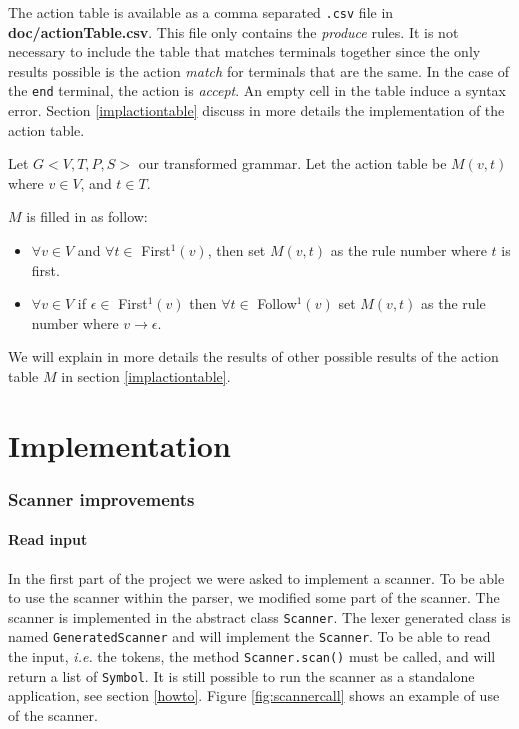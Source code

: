 \documentclass[letterpaper]{article}
\begin{document}
The action table is available as a comma separated \texttt{.csv} file in
\textbf{doc/actionTable.csv}. This file only contains the
\textit{produce} rules.
It is not necessary to include the table that matches terminals together
since the only results possible is the action \textit{match}
for terminals that are the same.
In the case of the \texttt{end} terminal, the action is \textit{accept}.
An empty cell in the table induce a syntax error.
Section \ref{implactiontable} discuss in more details the implementation
of the action table.

Let $G<V, T, P, S>$ our transformed grammar.
Let the action table be $M(v, t)$ where
$v \in V$, and $t \in T$.

$M$ is filled in as follow:
\begin{itemize}
    \item $\forall v \in V$ and $\forall t \in$ First$^1(v)$,
    then set $M(v, t)$ as the rule number where $t$ is first.
    \item $\forall v \in V$ if $\epsilon \in $ First$^1(v)$ then
    $\forall t \in$ Follow$^1(v)$ set $M(v, t)$ as the rule number
    where $v \rightarrow \epsilon$.
\end{itemize}

We will explain in more details the results of other possible results
of the action table $M$ in section \ref{implactiontable}.

\section{Implementation}

\subsubsection{Scanner improvements}

\paragraph{Read input}
In the first part of the project we were asked to implement a scanner.
To be able to use the scanner within the parser, we modified some part of the
scanner. The scanner is implemented in the abstract class \texttt{Scanner}.
The lexer generated class is named \texttt{GeneratedScanner} and will
implement the \texttt{Scanner}. To be able to read the input, \textit{i.e.}
the tokens, the method \texttt{Scanner.scan()} must be called, and
will return a list of \texttt{Symbol}. It is still possible to run the scanner
as a standalone application, see section \ref{howto}.
Figure \ref{fig:scannercall} shows an example of use of the scanner.
\end{document}
